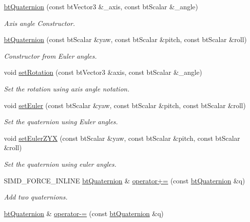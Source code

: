 \begin{DoxyCompactItemize}
\hyperlink{classbtQuaternion_a2b2e9ed0014eb26ed076808fb76e9d69}{bt\+Quaternion} (const bt\+Vector3 \&\+\_\+axis, const bt\+Scalar \&\+\_\+angle)
\begin{DoxyCompactList}\small\item\em Axis angle Constructor. \end{DoxyCompactList}\item 
\hyperlink{classbtQuaternion_a8bd5d699377ba585749d325076616ffb}{bt\+Quaternion} (const bt\+Scalar \&yaw, const bt\+Scalar \&pitch, const bt\+Scalar \&roll)
\begin{DoxyCompactList}\small\item\em Constructor from Euler angles. \end{DoxyCompactList}\item 
void \hyperlink{classbtQuaternion_ade840b704d06ad0092b996b432b8a8a6}{set\+Rotation} (const bt\+Vector3 \&axis, const bt\+Scalar \&\+\_\+angle)
\begin{DoxyCompactList}\small\item\em Set the rotation using axis angle notation. \end{DoxyCompactList}\item 
void \hyperlink{classbtQuaternion_aed0a6469d6c6c1e379f1143ad62b3439}{set\+Euler} (const bt\+Scalar \&yaw, const bt\+Scalar \&pitch, const bt\+Scalar \&roll)
\begin{DoxyCompactList}\small\item\em Set the quaternion using Euler angles. \end{DoxyCompactList}\item 
void \hyperlink{classbtQuaternion_a808b430136b4a8d1e7120134af14a1ff}{set\+Euler\+Z\+YX} (const bt\+Scalar \&yaw, const bt\+Scalar \&pitch, const bt\+Scalar \&roll)
\begin{DoxyCompactList}\small\item\em Set the quaternion using euler angles. \end{DoxyCompactList}\item 
S\+I\+M\+D\+\_\+\+F\+O\+R\+C\+E\+\_\+\+I\+N\+L\+I\+NE \hyperlink{classbtQuaternion}{bt\+Quaternion} \& \hyperlink{classbtQuaternion_a1212e4cbaa71da187984d3c174a4cc04}{operator+=} (const \hyperlink{classbtQuaternion}{bt\+Quaternion} \&q)
\begin{DoxyCompactList}\small\item\em Add two quaternions. \end{DoxyCompactList}\item 
\hyperlink{classbtQuaternion}{bt\+Quaternion} \& \hyperlink{classbtQuaternion_ac942e70c62d09538e3f6d9c42bc42c5c}{operator-\/=} (const \hyperlink{classbtQuaternion}{bt\+Quaternion} \&q)

\end{DoxyCompactItemize}

